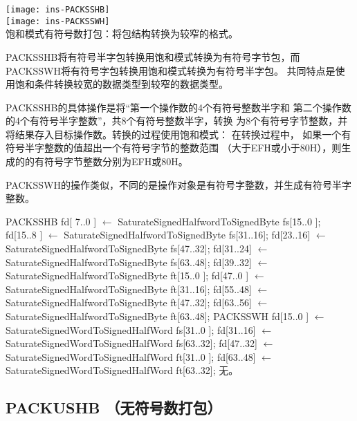 \begin{instructionblk}
  \texttt{[image: ins-PACKSSHB]} \\
  \texttt{[image: ins-PACKSSWH]} \\
  {饱和模式有符号数打包：将包结构转换为较窄的格式。}
  {PACKSSHB将有符号半字包转换用饱和模式转换为有符号字节包，而
  PACKSSWH将有符号字包转换用饱和模式转换为有符号半字包。
  共同特点是使用饱和条件转换较宽的数据类型到较窄的数据类型。

  PACKSSHB的具体操作是将``第一个操作数的4个有符号整数半字和
  第二个操作数的4个有符号半字整数''，共8个有符号整数半字，转换
  为8个有符号字节整数，并将结果存入目标操作数。转换的过程使用饱和模式：
  在转换过程中， 如果一个有符号半字整数的值超出一个有符号字节的整数范围
  （大于EFH或小于80H），则生成的的有符号字节整数分别为EFH或80H。
  
  PACKSSWH的操作类似，不同的是操作对象是有符号字整数，并生成有符号半字整数。}
  {PACKSSHB \narrownewline
  fd[ 7..0 ] $\leftarrow$ SaturateSignedHalfwordToSignedByte fs[15..0 ]; \narrownewline
  fd[15..8 ] $\leftarrow$ SaturateSignedHalfwordToSignedByte fs[31..16]; \narrownewline
  fd[23..16] $\leftarrow$ SaturateSignedHalfwordToSignedByte fs[47..32]; \narrownewline
  fd[31..24] $\leftarrow$ SaturateSignedHalfwordToSignedByte fs[63..48]; \narrownewline
  fd[39..32] $\leftarrow$ SaturateSignedHalfwordToSignedByte ft[15..0 ]; \narrownewline
  fd[47..0 ] $\leftarrow$ SaturateSignedHalfwordToSignedByte ft[31..16]; \narrownewline
  fd[55..48] $\leftarrow$ SaturateSignedHalfwordToSignedByte ft[47..32]; \narrownewline
  fd[63..56] $\leftarrow$ SaturateSignedHalfwordToSignedByte ft[63..48]; \narrownewline \narrownewline
  PACKSSWH \narrownewline
  fd[15..0 ] $\leftarrow$  SaturateSignedWordToSignedHalfWord fs[31..0 ]; \narrownewline
  fd[31..16] $\leftarrow$  SaturateSignedWordToSignedHalfWord fs[63..32]; \narrownewline
  fd[47..32] $\leftarrow$  SaturateSignedWordToSignedHalfWord ft[31..0 ]; \narrownewline
  fd[63..48] $\leftarrow$  SaturateSignedWordToSignedHalfWord ft[63..32];}
  {无。}
\end{instructionblk}


\subsection{PACKUSHB （无符号数打包）}

